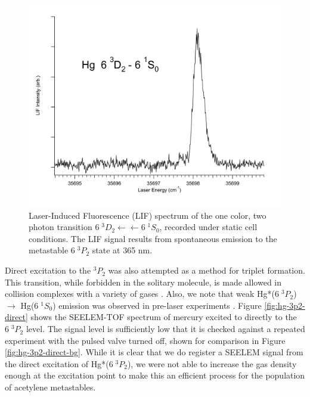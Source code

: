 \documentclass[12pt]{mitthesis}
\begin{document}
\begin{figure}
  \caption{Laser-Induced Fluorescence (LIF) spectrum of the one color,
    two photon transition  $6\;^3D_2 \leftarrow \leftarrow
    6\;^1S_0$, recorded under static cell conditions.  The LIF signal
    results from spontaneous emission to the metastable $6\;^3P_2$
    state at 365 nm.}
  \label{fig:hg3d2-cell}
  \centering
  \vspace{1cm}
  \includegraphics[width=6in]{Hg3D2-cell.pdf}
  \vspace{1cm}
\end{figure}

Direct excitation to the $^3P_2$ was also attempted as a method for
triplet formation.  This transition, while forbidden in the solitary
molecule, is made allowed in collision complexes with a variety of
gases \cite{kurosawa98, amano98}.  Also, we note that weak Hg*($6 \; ^3P_2$)
$\rightarrow$ Hg($6 \; ^1S_0$) emission was observed in pre-laser
experiments \cite{mrozowski45}.  Figure \ref{fig:hg-3p2-direct} shows
the SEELEM-TOF spectrum of mercury excited to directly to the $6 \;
^3P_2$ level.  The signal level is sufficiently low that it is checked
against a repeated experiment with the pulsed valve turned off, shown
for comparison in Figure \ref{fig:hg-3p2-direct-bg}.  While it is
clear that we do register a SEELEM signal from the direct excitation
of Hg*($6 \; ^3P_2$), we were not able to increase the gas density
enough at the excitation point to make this an efficient process for
the population of acetylene metastables.
\end{document}
